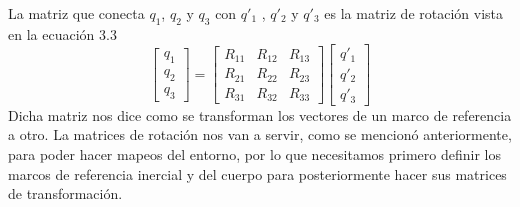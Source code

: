 La matriz que conecta $q_1$, $q_2$ y $q_3$ con $q'_1$ , $q'_2$ y $q'_3$ es la matriz de
rotación vista en la ecuación 3.3
\begin{equation}
	\begin{bmatrix}
		q_1 \\
		q_2 \\
		q_3
	\end{bmatrix}
	=
	\begin{bmatrix}
		R_{11} & R_{12} & R_{13} \\
		R_{21} & R_{22} & R_{23} \\
		R_{31} & R_{32} & R_{33}
	\end{bmatrix}
	\begin{bmatrix}
		q'_1 \\
		q'_2 \\
		q'_3
	\end{bmatrix}
\end{equation}
Dicha matriz nos dice como se transforman los vectores de un marco de referencia a otro. La matrices
de rotación nos van a servir, como se mencionó anteriormente, para poder hacer mapeos del entorno, por
lo que necesitamos primero definir los marcos de referencia inercial y del cuerpo para posteriormente
hacer sus matrices de transformación.




